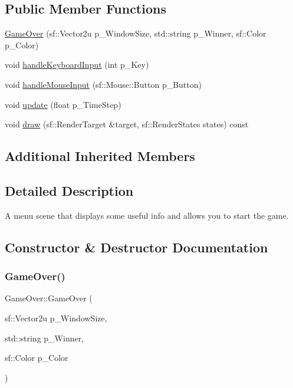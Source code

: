 \subsection*{Public Member Functions}
\begin{DoxyCompactItemize}
\item 
\hyperlink{class_game_over_a03eea2a6051e37b40465cac9377fa7ec}{Game\+Over} (sf\+::\+Vector2u p\+\_\+\+Window\+Size, std\+::string p\+\_\+\+Winner, sf\+::\+Color p\+\_\+\+Color)
\item 
void \hyperlink{class_game_over_aae04263371e8f82199df51de54ef77d1}{handle\+Keyboard\+Input} (int p\+\_\+\+Key)
\item 
void \hyperlink{class_game_over_a83c0cecb3faab5ea8c36272e931006f7}{handle\+Mouse\+Input} (sf\+::\+Mouse\+::\+Button p\+\_\+\+Button)
\item 
void \hyperlink{class_game_over_a6b9465b5c095a1de0e467baf17045fac}{update} (float p\+\_\+\+Time\+Step)
\item 
void \hyperlink{class_game_over_a4792ee9e2b587f98576a8023d34f5f5c}{draw} (sf\+::\+Render\+Target \&target, sf\+::\+Render\+States states) const
\end{DoxyCompactItemize}
\subsection*{Additional Inherited Members}


\subsection{Detailed Description}
A menu scene that displays some useful info and allows you to start the game. 

\subsection{Constructor \& Destructor Documentation}
\mbox{\label{class_game_over_a03eea2a6051e37b40465cac9377fa7ec}} 
\subsubsection{\texorpdfstring{Game\+Over()}{GameOver()}}
{\footnotesize\ttfamily Game\+Over\+::\+Game\+Over (\begin{DoxyParamCaption}\item[{sf\+::\+Vector2u}]{p\+\_\+\+Window\+Size,  }\item[{std\+::string}]{p\+\_\+\+Winner,  }\item[{sf\+::\+Color}]{p\+\_\+\+Color }\end{DoxyParamCaption})}

